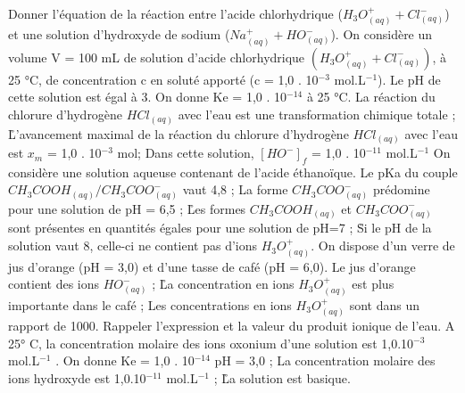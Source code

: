 \q	
Donner l'équation de la réaction entre l'acide chlorhydrique ($H_3O^+_{(aq)} + Cl^{-}_{(aq)}$) et une solution d'hydroxyde de sodium ($Na^{+}_{(aq)} + HO^{-}_{(aq)}$).
  \q	
On considère un volume V = 100 mL de solution d'acide chlorhydrique $(H_3O^+_{(aq)} + Cl^-_{(aq)})$, à 25 °C, de concentration c en soluté apporté (c = 1,0 . 10$^{-3}$ mol.L$^{-1}$). Le pH de cette solution est égal à 3. 
On donne Ke = 1,0 . 10$^{-14}$ à 25 °C.
\rv
La réaction du chlorure d'hydrogène $HCl_{(aq)}$ avec l'eau est une transformation chimique totale ;
\r
L'avancement maximal de la réaction du chlorure d'hydrogène $HCl_{(aq)}$ avec l'eau est $x_m$ = 1,0 . 10$^{-3}$ mol;
\rv
Dans cette solution, $[HO^{-}]_f$ = 1,0 . 10$^{-11}$ mol.L$^{-1}$   
 \q	
On considère une solution aqueuse contenant de l'acide éthanoïque.
Le pKa du couple $CH_3COOH_{(aq)}/ CH_3COO^{-}_{(aq)}$  vaut 4,8 ;
\rv
La forme $CH_3COO^{-}_{(aq)}$  prédomine  pour une solution de pH = 6,5 ;
\r
Les formes $CH_3COOH_{(aq)}$ et $CH_3COO^{-}_{(aq)}$ sont présentes en quantités égales pour une solution de pH=7 ;
\r
Si le pH de la solution vaut 8, celle-ci ne contient pas d'ions $H_3O^+_{(aq)}$.
\q
On dispose d'un verre de jus d'orange (pH = 3,0) et d'une tasse de café (pH = 6,0). 
\rv
Le jus d'orange contient des ions $HO^{-}_{(aq)}$ ; 
\r
La concentration en ions $H_3O^+_{(aq)}$  est plus importante dans le café ;
\rv
Les concentrations en ions $H_3O^+_{(aq)}$ sont dans un rapport de  1000.
\q
Rappeler l'expression et la valeur du produit ionique de l'eau.
 \q	
A 25° C, la concentration molaire des ions oxonium d'une solution est 1,0.10$^{-3}$ mol.L$^{-1}$ . 
On donne Ke = 1,0 . 10$^{-14}$ 
\rv
pH = 3,0 ;
\rv La concentration molaire des ions hydroxyde est 1,0.10$^{-11}$ mol.L$^{-1}$ ;
\r
La solution est basique.

